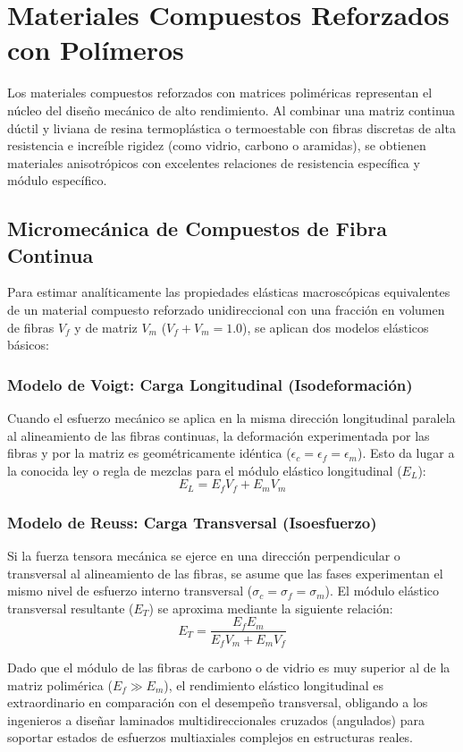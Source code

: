 \chapter{Materiales Compuestos Reforzados con Polímeros}
\label{cap:compuestos}

Los materiales compuestos reforzados con matrices poliméricas representan el núcleo del diseño mecánico de alto rendimiento. Al combinar una matriz continua dúctil y liviana de resina termoplástica o termoestable con fibras discretas de alta resistencia e increíble rigidez (como vidrio, carbono o aramidas), se obtienen materiales anisotrópicos con excelentes relaciones de resistencia específica y módulo específico.

\section{Micromecánica de Compuestos de Fibra Continua}

Para estimar analíticamente las propiedades elásticas macroscópicas equivalentes de un material compuesto reforzado unidireccional con una fracción en volumen de fibras $V_f$ y de matriz $V_m$ ($V_f + V_m = 1.0$), se aplican dos modelos elásticos básicos:

\subsection{Modelo de Voigt: Carga Longitudinal (Isodeformación)}
Cuando el esfuerzo mecánico se aplica en la misma dirección longitudinal paralela al alineamiento de las fibras continuas, la deformación experimentada por las fibras y por la matriz es geométricamente idéntica ($\epsilon_c = \epsilon_f = \epsilon_m$). Esto da lugar a la conocida ley o regla de mezclas para el módulo elástico longitudinal ($E_L$):
\begin{equation}
    E_L = E_f V_f + E_m V_m
    \label{eq:voigt}
\end{equation}

\subsection{Modelo de Reuss: Carga Transversal (Isoesfuerzo)}
Si la fuerza tensora mecánica se ejerce en una dirección perpendicular o transversal al alineamiento de las fibras, se asume que las fases experimentan el mismo nivel de esfuerzo interno transversal ($\sigma_c = \sigma_f = \sigma_m$). El módulo elástico transversal resultante ($E_T$) se aproxima mediante la siguiente relación:
\begin{equation}
    E_T = \frac{E_f E_m}{E_f V_m + E_m V_f}
    \label{eq:reuss}
\end{equation}

Dado que el módulo de las fibras de carbono o de vidrio es muy superior al de la matriz polimérica ($E_f \gg E_m$), el rendimiento elástico longitudinal es extraordinario en comparación con el desempeño transversal, obligando a los ingenieros a diseñar laminados multidireccionales cruzados (angulados) para soportar estados de esfuerzos multiaxiales complejos en estructuras reales.
